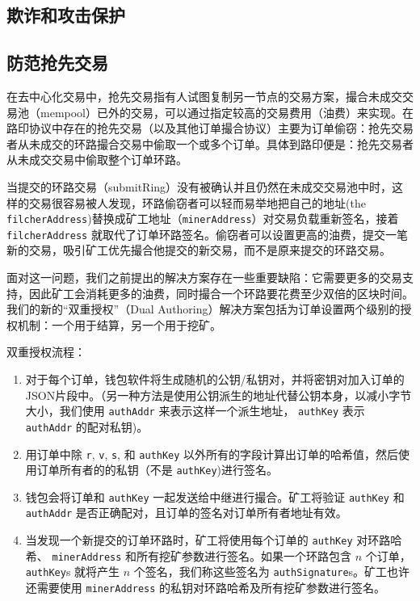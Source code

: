 \documentclass[UTF8]{ctexart}
\begin{document}
\begin{multicols}{2}
\section{欺诈和攻击保护}

\subsection{防范抢先交易\label{sec:dual_authoring}}

在去中心化交易中，抢先交易指有人试图复制另一节点的交易方案，撮合未成交交易池（mempool）已外的交易，可以通过指定较高的交易费用（油费）来实现。在路印协议中存在的抢先交易（以及其他订单撮合协议）主要为订单偷窃：抢先交易者从未成交的环路撮合交易中偷取一个或多个订单。具体到路印便是：抢先交易者从未成交交易中偷取整个订单环路。


当提交的环路交易（submitRing）没有被确认并且仍然在未成交交易池中时，这样的交易很容易被人发现，环路偷窃者可以轻而易举地把自己的地址(the \verb|filcherAddress|)替换成矿工地址（\verb|minerAddress|）对交易负载重新签名，接着 \verb|filcherAddress| 就取代了订单环路签名。偷窃者可以设置更高的油费，提交一笔新的交易，吸引矿工优先撮合他提交的新交易，而不是原来提交的环路交易。

面对这一问题，我们之前提出的解决方案存在一些重要缺陷：它需要更多的交易支持，因此矿工会消耗更多的油费，同时撮合一个环路要花费至少双倍的区块时间。我们的新的“双重授权”（Dual Authoring）解决方案包括为订单设置两个级别的授权机制：一个用于结算，另一个用于挖矿。


双重授权流程：

\begin{enumerate}

	\item 对于每个订单，钱包软件将生成随机的公钥/私钥对，并将密钥对加入订单的JSON片段中。（另一种方法是使用公钥派生的地址代替公钥本身，以减小字节大小，我们使用 \verb|authAddr| 来表示这样一个派生地址， \verb|authKey| 表示 \verb|authAddr| 的配对私钥)。

	\item 用订单中除 \verb|r|, \verb|v|, \verb|s|, 和 \verb|authKey| 以外所有的字段计算出订单的哈希值，然后使用订单所有者的的私钥（不是 \verb|authKey|)进行签名。

	\item 钱包会将订单和 \verb|authKey| 一起发送给中继进行撮合。矿工将验证 \verb|authKey| 和 \verb|authAddr| 是否正确配对，且订单的签名对订单所有者地址有效。 

	\item 当发现一个新提交的订单环路时，矿工将使用每个订单的 \verb|authKey| 对环路哈希、 \verb|minerAddress| 和所有挖矿参数进行签名。如果一个环路包含 $n$ 个订单，\verb|authKey|s 就将产生 $n$ 个签名，我们称这些签名为 \verb|authSignature|s。矿工也许还需要使用 \verb|minerAddress| 的私钥对环路哈希及所有挖矿参数进行签名。


\end{enumerate}
\end{multicols}
\end{document}
